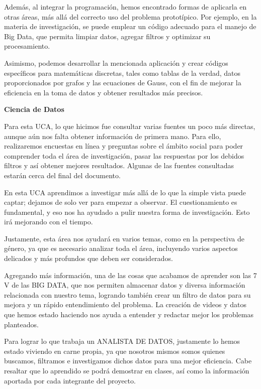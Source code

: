 \documentclass[12pt]{article}
\begin{document}
{{{{Además, al integrar la programación, hemos encontrado formas de aplicarla en otras áreas, más allá del correcto uso del problema prototípico. Por ejemplo, en la materia de investigación, se puede emplear un código adecuado para el manejo de Big Data, que permita limpiar datos, agregar filtros y optimizar su procesamiento.

Asimismo, podemos desarrollar la mencionada aplicación y crear códigos específicos para matemáticas discretas, tales como tablas de la verdad, datos proporcionados por grafos y las ecuaciones de Gauss, con el fin de mejorar la eficiencia en la toma de datos y obtener resultados más precisos.
		\newpage
		\begin{center}
			{\huge \textbf{Ciencia de Datos}}
		\end{center}
		\vspace{1cm} 
		{\large %
	Para esta UCA, lo que hicimos fue consultar varias fuentes un poco más directas, aunque aún nos falta obtener información de primera mano. Para ello, realizaremos encuestas en línea y preguntas sobre el ámbito social para poder comprender toda el área de investigación, pasar las respuestas por los debidos filtros y así obtener mejores resultados. Algunas de las fuentes consultadas estarán cerca del final del documento.
	
	En esta UCA aprendimos a investigar más allá de lo que la simple vista puede captar; dejamos de solo ver para empezar a observar. El cuestionamiento es fundamental, y eso nos ha ayudado a pulir nuestra forma de investigación. Esto irá mejorando con el tiempo.
	
	Justamente, esta área nos ayudará en varios temas, como en la perspectiva de género, ya que es necesario analizar toda el área, incluyendo varios aspectos delicados y más profundos que deben ser considerados.
	
	Agregando más información, una de las cosas que acabamos de aprender son las 7 V de las BIG DATA, que nos permiten almacenar datos y diversa información relacionada con nuestro tema, logrando también crear un filtro de datos para su mejora y un rápido entendimiento del problema. La creación de videos y datos que hemos estado haciendo nos ayuda a entender y redactar mejor los problemas planteados.
	
	Para lograr lo que trabaja un ANALISTA DE DATOS, justamente lo hemos estado viviendo en carne propia, ya que nosotros mismos somos quienes buscamos, filtramos e investigamos dichos datos para una mejor eficiencia. Cabe resaltar que lo aprendido se podrá demostrar en clases, así como la información aportada por cada integrante del proyecto.
	
}}}}}
\end{document}
